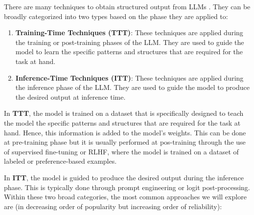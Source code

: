 There are many techniques to obtain structured output from LLMs \cite{liang2024controllabletextgenerationlarge}. They can be broadly categorized into two types based on the phase they are applied to:

\begin{enumerate}
    \item \textbf{Training-Time Techniques (TTT)}: These techniques are applied during the training or post-training phases of the LLM. They are used to guide the model to learn the specific patterns and structures that are required for the task at hand.
    \item \textbf{Inference-Time Techniques (ITT)}: These techniques are applied during the inference phase of the LLM. They are used to guide the model to produce the desired output at inference time.
\end{enumerate}

In \textbf{TTT}, the model is trained on a dataset that is specifically designed to teach the model the specific patterns and structures that are required for the task at hand. Hence, this information is added to the model's weights. This can be done at pre-training phase but it is usually performed at pos-training through the use of supervised fine-tuning or RLHF, where the model is trained on a dataset of labeled or preference-based examples.

In \textbf{ITT}, the model is guided to produce the desired output during the inference phase. This is typically done through prompt engineering or logit post-processing.
Within these two broad categories, the most common approaches we will explore are (in decreasing order of popularity but increasing order of reliability):

